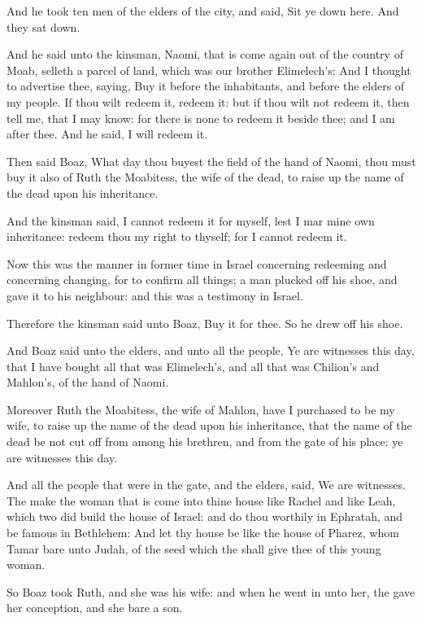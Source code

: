\verse And he took ten men of the elders of the city, and said, Sit ye down here. And they sat down.

\verse And he said unto the kinsman, Naomi, that is come again out of the country of Moab, selleth a parcel of land, which was our brother Elimelech's: \verse And I thought to advertise thee, saying, Buy it before the inhabitants, and before the elders of my people. If thou wilt redeem it, redeem it: but if thou wilt not redeem it, then tell me, that I may know: for there is none to redeem it beside thee; and I am after thee. And he said, I will redeem it.

\verse Then said Boaz, What day thou buyest the field of the hand of Naomi, thou must buy it also of Ruth the Moabitess, the wife of the dead, to raise up the name of the dead upon his inheritance.

\verse And the kinsman said, I cannot redeem it for myself, lest I mar mine own inheritance: redeem thou my right to thyself; for I cannot redeem it.

\verse Now this was the manner in former time in Israel concerning redeeming and concerning changing, for to confirm all things; a man plucked off his shoe, and gave it to his neighbour: and this was a testimony in Israel.

\verse Therefore the kinsman said unto Boaz, Buy it for thee. So he drew off his shoe.

\verse And Boaz said unto the elders, and unto all the people, Ye are witnesses this day, that I have bought all that was Elimelech's, and all that was Chilion's and Mahlon's, of the hand of Naomi.

\verse Moreover Ruth the Moabitess, the wife of Mahlon, have I purchased to be my wife, to raise up the name of the dead upon his inheritance, that the name of the dead be not cut off from among his brethren, and from the gate of his place: ye are witnesses this day.

\verse And all the people that were in the gate, and the elders, said, We are witnesses. The \LORD make the woman that is come into thine house like Rachel and like Leah, which two did build the house of Israel: and do thou worthily in Ephratah, and be famous in Bethlehem: \verse And let thy house be like the house of Pharez, whom Tamar bare unto Judah, of the seed which the \LORD shall give thee of this young woman.

\verse So Boaz took Ruth, and she was his wife: and when he went in unto her, the \LORD gave her conception, and she bare a son.

